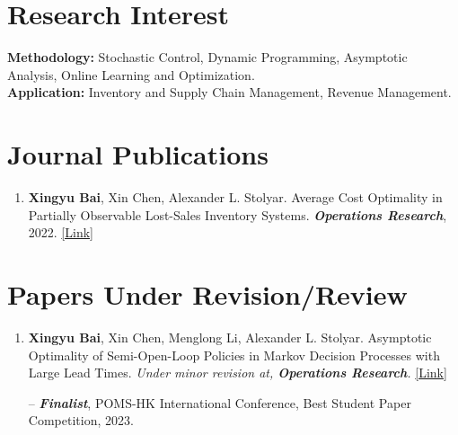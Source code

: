 \documentclass[margin,line]{resume}
\begin{document}
\begin{resume}
   

    \section{\mysidestyle Research Interest}
    
    \textbf{Methodology:} Stochastic Control, Dynamic Programming, Asymptotic Analysis, Online Learning and Optimization.\\
    \textbf{Application:} Inventory and Supply Chain Management, Revenue Management.
    
    

    \section{\mysidestyle  Journal Publications} 
     \begin{enumerate}[topsep=0pt, leftmargin=*]
     \item \textbf{Xingyu Bai}, Xin Chen, Alexander L. Stolyar. Average Cost Optimality in Partially Observable Lost-Sales Inventory Systems. \textbf{\textit{Operations Research}}, 2022. \href{https://pubsonline.informs.org/doi/abs/10.1287/opre.2022.2305}{[Link]} \\
     \end{enumerate}
    
 	  \section{\mysidestyle Papers Under Revision/Review} 
 	  \begin{enumerate}[topsep=0pt, leftmargin=*]
 	     \item \textbf{Xingyu Bai}, Xin Chen, Menglong Li, Alexander L. Stolyar. Asymptotic Optimality of Semi-Open-Loop Policies in Markov Decision Processes with Large Lead Times. \textit{Under minor revision at, \textbf{Operations Research}.} \href{https://papers.ssrn.com/sol3/papers.cfm?abstract_id=3685551}{[Link]}
 	     
 	     -- \textbf{\textit{Finalist}}, POMS-HK International Conference, Best Student Paper Competition, 2023.\\ 	  
 	     

\end{enumerate}
\end{resume}
\end{document}
